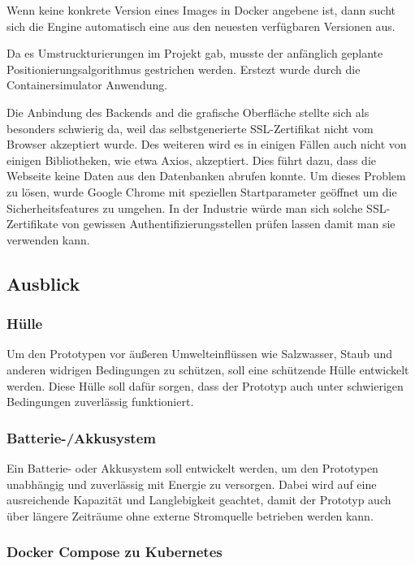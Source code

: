 \documentclass[
    headings=optiontotocandhead,%
    twoside,
    numbers=noenddot,%
    12pt, %
    titlepage, %
    parskip=full, %
    listof=leveldown, 
    numbers=noenddot, %
    a4paper,DIV=14,
    BCOR=15mm,
]{scrbook}
\begin{document}
Wenn keine konkrete Version eines Images in Docker angebene ist, dann
sucht sich die Engine automatisch eine aus den neuesten verfügbaren
Versionen aus.

Da es Umstruckturierungen im Projekt gab, musste der anfänglich geplante
Positionierungsalgorithmus gestrichen werden. Erstezt wurde durch die
Containersimulator Anwendung.

Die Anbindung des Backends and die grafische Oberfläche stellte sich als
besonders schwierig da, weil das selbstgenerierte SSL-Zertifikat nicht
vom Browser akzeptiert wurde. Des weiteren wird es in einigen Fällen
auch nicht von einigen Bibliotheken, wie etwa Axios, akzeptiert. Dies
führt dazu, dass die Webseite keine Daten aus den Datenbanken abrufen
konnte. Um dieses Problem zu lösen, wurde Google Chrome mit speziellen
Startparameter geöffnet um die Sicherheitsfeatures zu umgehen. In der
Industrie würde man sich solche SSL-Zertifikate von gewissen
Authentifizierungsstellen prüfen lassen damit man sie verwenden kann.

\hypertarget{ausblick}{%
\subsection{Ausblick}\label{ausblick}}

\hypertarget{huxfclle}{%
\subsubsection{Hülle}\label{huxfclle}}

Um den Prototypen vor äußeren Umwelteinflüssen wie Salzwasser, Staub und
anderen widrigen Bedingungen zu schützen, soll eine schützende Hülle
entwickelt werden. Diese Hülle soll dafür sorgen, dass der Prototyp auch
unter schwierigen Bedingungen zuverlässig funktioniert.

\hypertarget{batterie-akkusystem}{%
\subsubsection{Batterie-/Akkusystem}\label{batterie-akkusystem}}

Ein Batterie- oder Akkusystem soll entwickelt werden, um den Prototypen
unabhängig und zuverlässig mit Energie zu versorgen. Dabei wird auf eine
ausreichende Kapazität und Langlebigkeit geachtet, damit der Prototyp
auch über längere Zeiträume ohne externe Stromquelle betrieben werden
kann.

\hypertarget{docker-compose-zu-kubernetes}{%
\subsubsection{Docker Compose zu
Kubernetes}\label{docker-compose-zu-kubernetes}}
\end{document}
